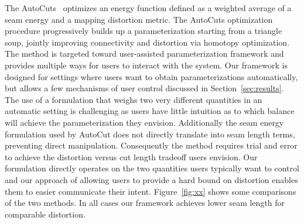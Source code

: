 %

The AutoCuts~\cite{Poranne2017Autocuts} optimizes an energy function defined as a weighted average of a seam energy and a mapping distortion metric. The AutoCuts optimization procedure progressively builds up a parameterization starting from a triangle soup, jointly improving connectivity and distortion via homotopy optimization. 
The method is targeted toward user-assisted parameterization framework and provides multiple ways for users to interact with the system. Our framework is designed for settings where users want to obtain parameterizations automatically, but allows a few mechanisms of user control discussed in Section~\ref{sec:results}. 
The use of a formulation that weighs two very different quantities  in an automatic setting is challenging as users have little intuition as to which balance will achieve the parameterization they envision. Additionally the seam energy formulation used by AutoCut does not directly translate into seam length terms, preventing direct manipulation. Consequently the method requires trial and error to achieve the distortion versus cut length tradeoff users envision.  
Our formulation directly operates on the two quantities users typically want to control and our approach of allowing users to provide a hard bound on distortion enables them to easier communicate their intent. Figure~\ref{fig:xx} shows some comparisons of the two methods. In all cases our framework achieves lower seam length for comparable distortion. 

